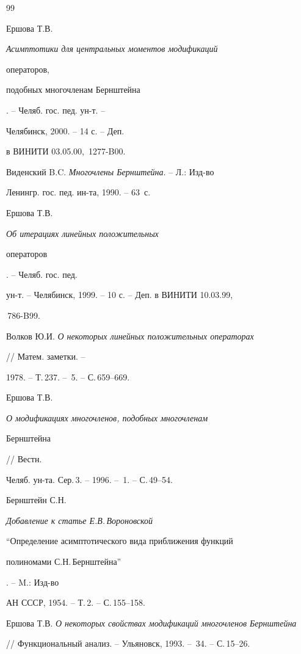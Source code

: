 \begin{thebibliography}{99} 


 




Ершова Т.В. {\em Асимптотики для центральных моментов модификаций 


операторов, 


подобных многочленам Бернштейна}. -- Челяб. гос. пед. ун-т. -- 


Челябинск, 2000. -- 14 с. -- Деп. 


в ВИНИТИ 03.05.00, \No\,1277-B00. 




Виденский B.C. {\em Многочлены Бернштейна}. -- Л.: Изд-во 


Ленингр. гос. пед. ин-та, 1990. -- 63~с. 




Ершова Т.В. {\em Об итерациях линейных положительных 


операторов}. -- Челяб. гос. пед. 


ун-т. -- Челябинск, 1999. -- 10 с. -- Деп. в ВИНИТИ 10.03.99, 


\No\,786-B99. 




Волков Ю.И. {\em О некоторых линейных положительных операторах} 


// Матем. заметки. -- 


1978. -- Т.\,237. -- \No\,5. -- С.\,659--669. 




Ершова Т.В. {\em О модификациях многочленов, подобных многочленам 


Бернштейна} // Вестн. 


Челяб. ун-та. Сер.\,3. -- 1996. -- \No\,1. -- С.\,49--54. 




Бернштейн С.Н. {\em Добавление к статье Е.В.\,Вороновской 


``Определение асимптотического вида приближения функций 


полиномами С.Н.\,Бернштейна''}. -- M.: Изд-во 


АН СССР, 1954. -- Т.\,2. -- С.\,155--158. 




Ершова Т.В. {\em О некоторых свойствах модификаций многочленов Бернштейна} 


// Функциональный анализ. -- Ульяновск, 1993. -- \No\,34. -- С.\,15--26. 



\end{thebibliography}
